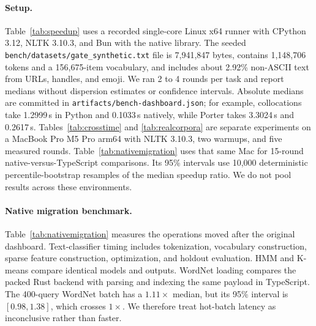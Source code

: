 \documentclass[pdflatex,sn-mathphys-num]{sn-jnl}
\theoremstyle{thmstyleone}
\begin{document}
\paragraph{Setup.}
Table~\ref{tab:speedup} uses a recorded single-core Linux x64 runner with CPython 3.12, NLTK 3.10.3, and Bun with the native library. The seeded \texttt{bench/datasets/gate\_synthetic.txt} file is 7{,}941{,}847 bytes, contains 1{,}148{,}706 tokens and a 156{,}675-item vocabulary, and includes about 2.92\% non-ASCII text from URLs, handles, and emoji. We ran 2 to 4 rounds per task and report medians without dispersion estimates or confidence intervals. Absolute medians are committed in \texttt{artifacts/bench-dashboard.json}; for example, collocations take 1.2999\,s in Python and 0.1033\,s natively, while Porter takes 3.3024\,s and 0.2617\,s. Tables~\ref{tab:crosstime} and \ref{tab:realcorpora} are separate experiments on a MacBook Pro M5 Pro arm64 with NLTK 3.10.3, two warmups, and five measured rounds. Table~\ref{tab:nativemigration} uses that same Mac for 15-round native-versus-TypeScript comparisons. Its 95\% intervals use 10{,}000 deterministic percentile-bootstrap resamples of the median speedup ratio. We do not pool results across these environments.

\paragraph{Native migration benchmark.}
Table~\ref{tab:nativemigration} measures the operations moved after the original dashboard. Text-classifier timing includes tokenization, vocabulary construction, sparse feature construction, optimization, and holdout evaluation. HMM and K-means compare identical models and outputs. WordNet loading compares the packed Rust backend with parsing and indexing the same payload in TypeScript. The 400-query WordNet batch has a $1.11\times$ median, but its 95\% interval is $[0.98,1.38]$, which crosses $1\times$. We therefore treat hot-batch latency as inconclusive rather than faster.
\end{document}
